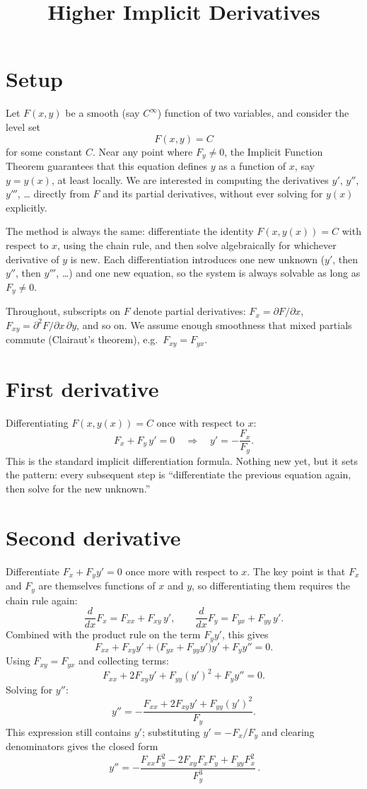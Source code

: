 \documentclass{essay}
\title{Higher Implicit Derivatives}
\author{}
\date{}
\begin{document}
\maketitle

\section{Setup}

Let $F(x,y)$ be a smooth (say $C^\infty$) function of two variables, and consider the level
set
\[ F(x,y) = C \]
for some constant $C$. Near any point where $F_y \neq 0$, the Implicit Function Theorem
guarantees that this equation defines $y$ as a function of $x$, say $y = y(x)$, at least
locally. We are interested in computing the derivatives $y'$, $y''$, $y'''$, \dots{} directly
from $F$ and its partial derivatives, without ever solving for $y(x)$ explicitly.

The method is always the same: differentiate the identity $F(x,y(x)) = C$ with respect to
$x$, using the chain rule, and then solve algebraically for whichever derivative of $y$ is
new. Each differentiation introduces one new unknown ($y'$, then $y''$, then $y'''$, \dots{})
and one new equation, so the system is always solvable as long as $F_y \neq 0$.

Throughout, subscripts on $F$ denote partial derivatives: $F_x = \partial F/\partial x$,
$F_{xy} = \partial^2 F/\partial x\, \partial y$, and so on. We assume enough smoothness that
mixed partials commute (Clairaut's theorem), e.g.\ $F_{xy} = F_{yx}$.

\section{First derivative}

Differentiating $F(x,y(x)) = C$ once with respect to $x$:
\[
F_x + F_y\, y' = 0
\quad\Longrightarrow\quad
y' = -\frac{F_x}{F_y}.
\]
This is the standard implicit differentiation formula. Nothing new yet, but it sets the
pattern: every subsequent step is ``differentiate the previous equation again, then solve
for the new unknown.''

\section{Second derivative}

Differentiate $F_x + F_y y' = 0$ once more with respect to $x$. The key point is that $F_x$
and $F_y$ are themselves functions of $x$ and $y$, so differentiating them requires the
chain rule again:
\[
\frac{d}{dx}F_x = F_{xx} + F_{xy}\,y', \qquad
\frac{d}{dx}F_y = F_{yx} + F_{yy}\,y'.
\]
Combined with the product rule on the term $F_y y'$, this gives
\[
F_{xx} + F_{xy}y' + \big(F_{yx} + F_{yy}y'\big)y' + F_y y'' = 0.
\]
Using $F_{xy} = F_{yx}$ and collecting terms:
\[
F_{xx} + 2F_{xy}y' + F_{yy}(y')^2 + F_y y'' = 0.
\]
Solving for $y''$:
\[
y'' = -\frac{F_{xx} + 2F_{xy}y' + F_{yy}(y')^2}{F_y}.
\]
This expression still contains $y'$; substituting $y' = -F_x/F_y$ and clearing denominators
gives the closed form
\[
\boxed{\,y'' = -\dfrac{F_{xx}F_y^2 - 2F_{xy}F_xF_y + F_{yy}F_x^2}{F_y^3}\,}.
\]
\end{document}
